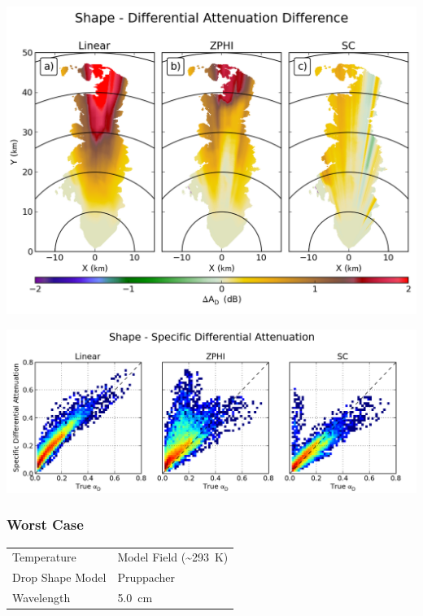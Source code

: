 \documentclass[red]{beamer}
\begin{document}
\begin{frame}
	\begin{center}
		\includegraphics[scale=0.45]{figures/C_Shape_Differential_Attenuation_Difference.png}
	\end{center}
\end{frame}

\begin{frame}
	\begin{center}
		\includegraphics[scale=0.45]{figures/C_Shape_Specific_Differential_Attenuation_scatter.png}
	\end{center}
\end{frame}

\begin{frame}
	\frametitle{Worst Case}
	\begin{center}
	    \begin{tabular}{ | l | l | }
	        \hline
	        Temperature & Model Field (\textasciitilde\SI{293}{\kelvin}) \\
	        Drop Shape Model & Pruppacher \\
	        Wavelength & \SI{5.0}{\centi\meter} \\
			\hline
	    \end{tabular}
	\end{center}	
\end{frame}
\end{document}
